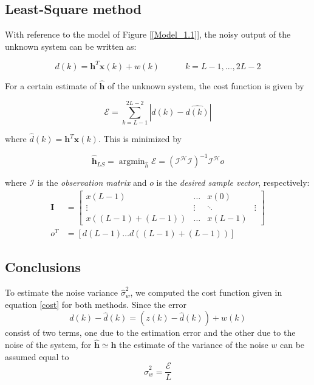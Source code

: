 \documentclass[a4paper, 12pt]{report}
\DeclareMathOperator*{\argmin}{argmin}
\begin{document}
\subsection*{Least-Square method}
With reference to the model of Figure [\ref{Model_1.1}], the noisy output of the unknown system can be written as:

\begin{equation*}
d(k) = \mathbf{h}^T\mathbf{x}(k)+w(k) \quad\quad\quad k=L-1,...,2L-2
\end{equation*}

For a certain estimate of \textbf{$\mathbf{\hat{h}}$} of the unknown system, the cost function is given by

\begin{equation}\label{cost}
\mathcal{E} = \sum_{k=L-1}^{2L-2}|d(k)-\hat{d(k)}|
\end{equation}

where $\hat{d}(k)=\mathbf{h}^T\mathbf{x}(k)$. This is minimized by 

\begin{equation}
\mathbf{\hat{h}}_{LS} = \argmin_{\hat{h}} \mathcal{E} = (\mathcal{I^HI})^{-1}\mathcal{I^H}o 
\end{equation}

where $\mathcal{I}$ is the \textit{observation matrix} and $o$ is the \textit{desired sample vector}, respectively:
\begin{equation*}
\begin{split}
\mathbf{I} &= \begin{bmatrix}
x(L-1) & \dots & x(0) \\
\vdots & \vdots & \ddots & \vdots \\
x((L-1)+(L-1)) &  \dots & x(L-1)
\end{bmatrix} \\
o^T &= [d(L-1) \dots d((L-1)+(L-1))]
\end{split}
\end{equation*}


\subsection*{Conclusions}
To estimate the noise variance $\hat{\sigma}_w^2$, we computed the cost function given in equation \ref{cost} for both methods. Since the error
\begin{equation*}
d(k) - \hat{d}(k) = (z(k)-\hat{d}(k))+w(k)
\end{equation*}
consist of two terms, one due to the estimation error and the other due to the noise of the system, for $\mathbf{\hat{h}}\simeq\mathbf{h}$ the estimate of the variance of the noise $w$ can be assumed equal to 
\begin{equation*}
\hat{\sigma}_w^2 = \frac{\mathcal{E}}{L}
\end{equation*} 
\end{document}
